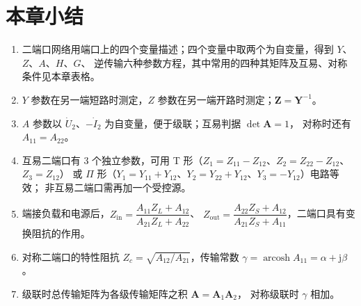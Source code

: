 \section{本章小结}
\begin{enumerate}
  \item 二端口网络用端口上的四个变量描述；四个变量中取两个为自变量，得到 $Y$、$Z$、$A$、$H$、$G$、
        逆传输六种参数方程，其中常用的四种其矩阵及互易、对称条件见本章表格。
  \item $Y$ 参数在另一端短路时测定，$Z$ 参数在另一端开路时测定；$\boldsymbol{Z}=\boldsymbol{Y}^{-1}$。
  \item $A$ 参数以 $\dot{U}_2$、$-\dot{I}_2$ 为自变量，便于级联；互易判据 $\det\boldsymbol{A}=1$，
        对称时还有 $A_{11}=A_{22}$。
  \item 互易二端口有 3 个独立参数，可用 T 形（$Z_1=Z_{11}-Z_{12}$、$Z_2=Z_{22}-Z_{12}$、$Z_3=Z_{12}$）
        或 $\Pi$ 形（$Y_1=Y_{11}+Y_{12}$、$Y_2=Y_{22}+Y_{12}$、$Y_3=-Y_{12}$）电路等效；
        非互易二端口需再加一个受控源。
  \item 端接负载和电源后，$Z_{\mathrm{in}}=\dfrac{A_{11}Z_L+A_{12}}{A_{21}Z_L+A_{22}}$、
        $Z_{\mathrm{out}}=\dfrac{A_{22}Z_S+A_{12}}{A_{21}Z_S+A_{11}}$，二端口具有变换阻抗的作用。
  \item 对称二端口的特性阻抗 $Z_c=\sqrt{A_{12}/A_{21}}$，传输常数
        $\gamma=\operatorname{arcosh}A_{11}=\alpha+\mathrm{j}\beta$。
  \item 级联时总传输矩阵为各级传输矩阵之积 $\boldsymbol{A}=\boldsymbol{A}_1\boldsymbol{A}_2$，
        对称级联时 $\gamma$ 相加。
\end{enumerate}

\endinput
